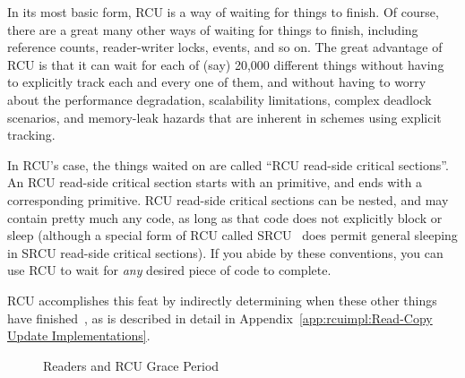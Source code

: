 In its most basic form, RCU is a way of waiting for things to finish.
Of course, there are a great many other ways of waiting for things to
finish, including reference counts, reader-writer locks, events, and so on.
The great advantage of RCU is that it can wait for each of
(say) 20,000 different things without having to explicitly
track each and every one of them, and without having to worry about
the performance degradation, scalability limitations, complex deadlock
scenarios, and memory-leak hazards that are inherent in schemes
using explicit tracking.

In RCU's case, the things waited on are called
``RCU read-side critical sections''.
An RCU read-side critical section starts with an
 primitive, and ends with a corresponding
 primitive.
RCU read-side critical sections can be nested, and may contain pretty
much any code, as long as that code does not explicitly block or sleep
(although a special form of RCU called SRCU~\cite{PaulEMcKenney2006c}
does permit general sleeping in SRCU read-side critical sections).
If you abide by these conventions, you can use RCU to wait for \emph{any}
desired piece of code to complete.

RCU accomplishes this feat by indirectly determining when these
other things have finished~\cite{PaulEMcKenney2007whatisRCU,
PaulEMcKenney2007PreemptibleRCU}, as is described in detail in
Appendix~\ref{app:rcuimpl:Read-Copy Update Implementations}.

\begin{figure}[tb]
\begin{center}
\end{center}
\caption{Readers and RCU Grace Period}
\label{fig:defer:Readers and RCU Grace Period}
\end{figure}

